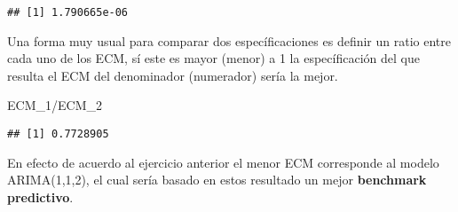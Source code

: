 \documentclass[
]{book}
\newenvironment{Shaded}{\begin{snugshade}}{\end{snugshade}}
\newcommand{\AttributeTok}[1]{\textcolor[rgb]{0.77,0.63,0.00}{#1}}
\newcommand{\DecValTok}[1]{\textcolor[rgb]{0.00,0.00,0.81}{#1}}
\newcommand{\FloatTok}[1]{\textcolor[rgb]{0.00,0.00,0.81}{#1}}
\newcommand{\FunctionTok}[1]{\textcolor[rgb]{0.00,0.00,0.00}{#1}}
\newcommand{\NormalTok}[1]{#1}
\newcommand{\OtherTok}[1]{\textcolor[rgb]{0.56,0.35,0.01}{#1}}
\newcommand{\SpecialCharTok}[1]{\textcolor[rgb]{0.00,0.00,0.00}{#1}}
\newcommand{\StringTok}[1]{\textcolor[rgb]{0.31,0.60,0.02}{#1}}
\begin{document}
\begin{Shaded}
\end{Shaded}

\begin{verbatim}
## [1] 1.790665e-06
\end{verbatim}

Una forma muy usual para comparar dos específicaciones es definir un ratio entre cada uno de los ECM, sí este es mayor (menor) a 1 la específicación del que resulta el ECM del denominador (numerador) sería la mejor.

\begin{Shaded}
\begin{Highlighting}[]
\NormalTok{ECM\_1}\SpecialCharTok{/}\NormalTok{ECM\_2}
\end{Highlighting}
\end{Shaded}

\begin{verbatim}
## [1] 0.7728905
\end{verbatim}

En efecto de acuerdo al ejercicio anterior el menor ECM corresponde al modelo ARIMA(1,1,2), el cual sería basado en estos resultado un mejor \textbf{benchmark predictivo}.
\end{document}
